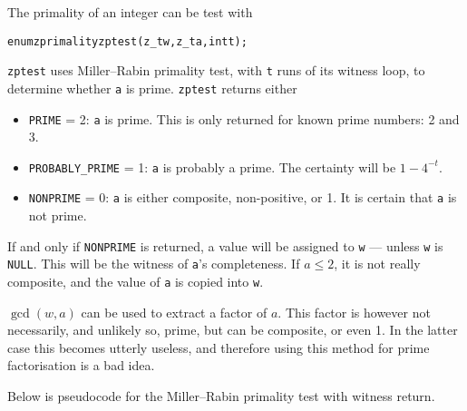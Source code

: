 The primality of an integer can be test with

\begin{alltt}
   enum zprimality zptest(z_t w, z_t a, int t);
\end{alltt}

\noindent
{\tt zptest} uses Miller–Rabin primality test,
with {\tt t} runs of its witness loop, to
determine whether {\tt a} is prime. {\tt zptest}
returns either

\begin{itemize}
\item {\tt PRIME} = 2:
{\tt a} is prime. This is only returned for
known prime numbers: 2 and 3.

\item {\tt PROBABLY\_PRIME} = 1:
{\tt a} is probably a prime. The certainty
will be $1 - 4^{-t}$.

\item {\tt NONPRIME} = 0:
{\tt a} is either composite, non-positive, or 1.
It is certain that {\tt a} is not prime.
\end{itemize}

If and only if {\tt NONPRIME} is returned, a
value will be assigned to {\tt w} — unless
{\tt w} is {\tt NULL}. This will be the witness
of {\tt a}'s completeness. If $a \le 2$, it
is not really composite, and the value of
{\tt a} is copied into {\tt w}.

$\gcd(w, a)$ can be used to extract a factor
of $a$. This factor is however not necessarily,
and unlikely so, prime, but can be composite,
or even 1. In the latter case this becomes
utterly useless, and therefore using this
method for prime factorisation is a bad idea.

Below is pseudocode for the Miller–Rabin primality
test with witness return.


